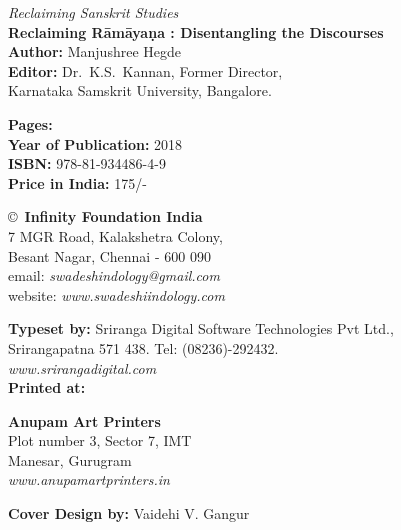\thispagestyle{empty}
\noindent
{\fontsize{9}{11}\selectfont\sl Reclaiming Sanskrit Studies}\\
{\bf Reclaiming Rāmāyaṇa : Disentangling the Discourses}\\ 
{\bf Author:} Manjushree Hegde\\
{\bf Editor:} Dr.\ K.S.\ Kannan, Former Director,\\ 
Karnataka Samskrit University, Bangalore.
\vfill

\noindent
{\bf Pages:} \pageref{book:end}\\
{\bf Year of Publication:} 2018\\
{\bf ISBN:} 978-81-934486-4-9\\
{\bf Price in India:} 175/-
\vfill

\noindent
\copyright\ {\bf Infinity Foundation India}\\ 
7 MGR Road, Kalakshetra Colony,\\ 
Besant Nagar, Chennai - 600 090\\
email: {\sl swadeshindology@gmail.com}\\
website: {\sl www.swadeshiindology.com} 
\vfill

\noindent
{\bf Typeset by:} Sriranga Digital Software Technologies Pvt Ltd.,\\ 
Srirangapatna 571 438. Tel: (08236)-292432.\\
{\sl www.srirangadigital.com}\\

\noindent
{\bf Printed at:}

\noindent
{\bf Anupam Art Printers}\\
Plot number 3, Sector 7, IMT\\
Manesar, Gurugram\\
{\sl www.anupamartprinters.in}

\medskip
\noindent
{\bf Cover Design by:} Vaidehi V. Gangur
